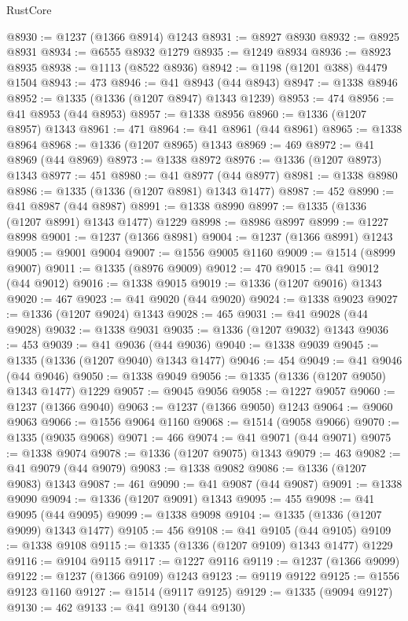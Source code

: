 \begin{lexlean}{RustCore}
\begin{coremodule}
@8930 := @1237 (@1366 @8914) @1243
@8931 := @8927 @8930
@8932 := @8925 @8931
@8934 := @6555 @8932 @1279
@8935 := @1249 @8934
@8936 := @8923 @8935
@8938 := @1113 (@8522 @8936)
@8942 := @1198 (@1201 @388) @4479 @1504
@8943 := 473
@8946 := @41 @8943 (@44 @8943)
@8947 := @1338 @8946
@8952 := @1335 (@1336 (@1207 @8947) @1343 @1239)
@8953 := 474
@8956 := @41 @8953 (@44 @8953)
@8957 := @1338 @8956
@8960 := @1336 (@1207 @8957) @1343
@8961 := 471
@8964 := @41 @8961 (@44 @8961)
@8965 := @1338 @8964
@8968 := @1336 (@1207 @8965) @1343
@8969 := 469
@8972 := @41 @8969 (@44 @8969)
@8973 := @1338 @8972
@8976 := @1336 (@1207 @8973) @1343
@8977 := 451
@8980 := @41 @8977 (@44 @8977)
@8981 := @1338 @8980
@8986 := @1335 (@1336 (@1207 @8981) @1343 @1477)
@8987 := 452
@8990 := @41 @8987 (@44 @8987)
@8991 := @1338 @8990
@8997 := @1335 (@1336 (@1207 @8991) @1343 @1477) @1229
@8998 := @8986 @8997
@8999 := @1227 @8998
@9001 := @1237 (@1366 @8981)
@9004 := @1237 (@1366 @8991) @1243
@9005 := @9001 @9004
@9007 := @1556 @9005 @1160
@9009 := @1514 (@8999 @9007)
@9011 := @1335 (@8976 @9009)
@9012 := 470
@9015 := @41 @9012 (@44 @9012)
@9016 := @1338 @9015
@9019 := @1336 (@1207 @9016) @1343
@9020 := 467
@9023 := @41 @9020 (@44 @9020)
@9024 := @1338 @9023
@9027 := @1336 (@1207 @9024) @1343
@9028 := 465
@9031 := @41 @9028 (@44 @9028)
@9032 := @1338 @9031
@9035 := @1336 (@1207 @9032) @1343
@9036 := 453
@9039 := @41 @9036 (@44 @9036)
@9040 := @1338 @9039
@9045 := @1335 (@1336 (@1207 @9040) @1343 @1477)
@9046 := 454
@9049 := @41 @9046 (@44 @9046)
@9050 := @1338 @9049
@9056 := @1335 (@1336 (@1207 @9050) @1343 @1477) @1229
@9057 := @9045 @9056
@9058 := @1227 @9057
@9060 := @1237 (@1366 @9040)
@9063 := @1237 (@1366 @9050) @1243
@9064 := @9060 @9063
@9066 := @1556 @9064 @1160
@9068 := @1514 (@9058 @9066)
@9070 := @1335 (@9035 @9068)
@9071 := 466
@9074 := @41 @9071 (@44 @9071)
@9075 := @1338 @9074
@9078 := @1336 (@1207 @9075) @1343
@9079 := 463
@9082 := @41 @9079 (@44 @9079)
@9083 := @1338 @9082
@9086 := @1336 (@1207 @9083) @1343
@9087 := 461
@9090 := @41 @9087 (@44 @9087)
@9091 := @1338 @9090
@9094 := @1336 (@1207 @9091) @1343
@9095 := 455
@9098 := @41 @9095 (@44 @9095)
@9099 := @1338 @9098
@9104 := @1335 (@1336 (@1207 @9099) @1343 @1477)
@9105 := 456
@9108 := @41 @9105 (@44 @9105)
@9109 := @1338 @9108
@9115 := @1335 (@1336 (@1207 @9109) @1343 @1477) @1229
@9116 := @9104 @9115
@9117 := @1227 @9116
@9119 := @1237 (@1366 @9099)
@9122 := @1237 (@1366 @9109) @1243
@9123 := @9119 @9122
@9125 := @1556 @9123 @1160
@9127 := @1514 (@9117 @9125)
@9129 := @1335 (@9094 @9127)
@9130 := 462
@9133 := @41 @9130 (@44 @9130)

\end{coremodule}
\end{lexlean}
